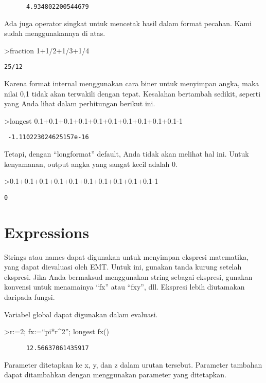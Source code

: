 \documentclass[
]{book}
\begin{document}
\begin{verbatim}
      4.934802200544679 
\end{verbatim}

Ada juga operator singkat untuk mencetak hasil dalam format pecahan. Kami sudah menggunakannya di atas.

\textgreater fraction 1+1/2+1/3+1/4

\begin{verbatim}
25/12
\end{verbatim}

Karena format internal menggunakan cara biner untuk menyimpan angka, maka nilai 0,1 tidak akan terwakili dengan tepat. Kesalahan bertambah sedikit, seperti yang Anda lihat dalam perhitungan berikut ini.

\textgreater longest 0.1+0.1+0.1+0.1+0.1+0.1+0.1+0.1+0.1+0.1-1

\begin{verbatim}
 -1.110223024625157e-16 
\end{verbatim}

Tetapi, dengan ``longformat'' default, Anda tidak akan melihat hal ini. Untuk kenyamanan, output angka yang sangat kecil adalah 0.

\textgreater0.1+0.1+0.1+0.1+0.1+0.1+0.1+0.1+0.1+0.1-1

\begin{verbatim}
0
\end{verbatim}

\chapter{Expressions}\label{expressions}

Strings atau names dapat digunakan untuk menyimpan ekspresi matematika, yang dapat dievaluasi oleh EMT. Untuk ini, gunakan tanda kurung setelah ekspresi. Jika Anda bermaksud menggunakan string sebagai ekspresi, gunakan konvensi untuk menamainya ``fx'' atau ``fxy'', dll. Ekspresi lebih diutamakan daripada fungsi.

Variabel global dapat digunakan dalam evaluasi.

\textgreater r:=2; fx:=``pi*r\^{}2''; longest fx()

\begin{verbatim}
      12.56637061435917 
\end{verbatim}

Parameter ditetapkan ke x, y, dan z dalam urutan tersebut. Parameter tambahan dapat ditambahkan dengan menggunakan parameter yang ditetapkan.
\end{document}
